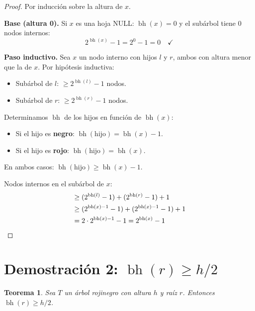 \documentclass[11pt, letterpaper]{article}
\theoremstyle{definition}
\theoremstyle{plain}
\newtheorem{theorem}{Teorema}[section]
\theoremstyle{remark}
\begin{document}
\begin{proof}
Por inducción sobre la altura de $x$.

\textbf{Base (altura 0).} Si $x$ es una hoja NULL:
$\operatorname{bh}(x) = 0$ y el subárbol tiene 0 nodos internos:
\[
  2^{\operatorname{bh}(x)} - 1 = 2^0 - 1 = 0 \quad \checkmark
\]

\textbf{Paso inductivo.} Sea $x$ un nodo interno con hijos $l$ y $r$,
ambos con altura menor que la de $x$. Por hipótesis inductiva:
\begin{itemize}
  \item Subárbol de $l$: $\geq 2^{\operatorname{bh}(l)} - 1$ nodos.
  \item Subárbol de $r$: $\geq 2^{\operatorname{bh}(r)} - 1$ nodos.
\end{itemize}

Determinamos $\operatorname{bh}$ de los hijos en función de
$\operatorname{bh}(x)$:
\begin{itemize}
  \item Si el hijo es \textbf{negro}: $\operatorname{bh}(\text{hijo})
    = \operatorname{bh}(x) - 1$.
  \item Si el hijo es \textbf{rojo}: $\operatorname{bh}(\text{hijo})
    = \operatorname{bh}(x)$.
\end{itemize}
En ambos casos: $\operatorname{bh}(\text{hijo}) \geq \operatorname{bh}(x) - 1$.

Nodos internos en el subárbol de $x$:
\begin{align*}
  &\geq (2^{\operatorname{bh}(l)} - 1)
      + (2^{\operatorname{bh}(r)} - 1) + 1 \\
  &\geq (2^{\operatorname{bh}(x)-1} - 1)
      + (2^{\operatorname{bh}(x)-1} - 1) + 1 \\
  &= 2 \cdot 2^{\operatorname{bh}(x)-1} - 1
   = 2^{\operatorname{bh}(x)} - 1 \qedhere
\end{align*}
\end{proof}

\section{Demostración 2:
  \texorpdfstring{$\operatorname{bh}(r) \geq h/2$}{bh(r) >= h/2}}

\begin{theorem}\label{thm:bh-half}
Sea $T$ un árbol rojinegro con altura $h$ y raíz $r$. Entonces
$\operatorname{bh}(r) \geq h/2$.
\end{theorem}
\end{document}
